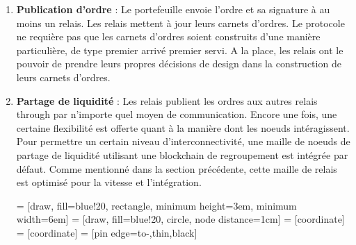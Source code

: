 \documentclass[UTF8,nofonts]{article}
\makeatletter
\newenvironment{figurehere}
 {\def\@captype{figure}}
 {}
\makeatother
\begin{document}
\begin{multicols}{2}
\begin{enumerate}
\item \textbf{Publication d'ordre} : Le portefeuille envoie l'ordre et sa signature à au moins un relais. Les relais mettent à jour leurs carnets d'ordres. Le protocole ne requière pas que les carnets d'ordres soient construits d'une manière particulière, de type premier arrivé premier servi. A la place, les relais ont le pouvoir de prendre leurs propres décisions de design dans la construction de leurs carnets d'ordres.

\item \textbf{Partage de liquidité} : Les relais publient les ordres aux autres relais through par n'importe quel moyen de communication. Encore une fois, une certaine flexibilité est offerte quant à la manière dont les noeuds intéragissent. Pour permettre un certain niveau d'interconnectivité, une maille de noeuds de partage de liquidité utilisant une blockchain de regroupement est intégrée par défaut. Comme mentionné dans la section précédente, cette maille de relais est optimisé pour la vitesse et l'intégration.

\begin{center}
\begin{figurehere}
\centering
{} = [draw, fill=blue!20, rectangle, 
    minimum height=3em, minimum width=6em]
 = [draw, fill=blue!20, circle, node distance=1cm]
 = [coordinate]
 = [coordinate]
 = [pin edge={to-,thin,black}]

\end{figurehere}
\end{center}
\end{enumerate}
\end{multicols}
\end{document}
